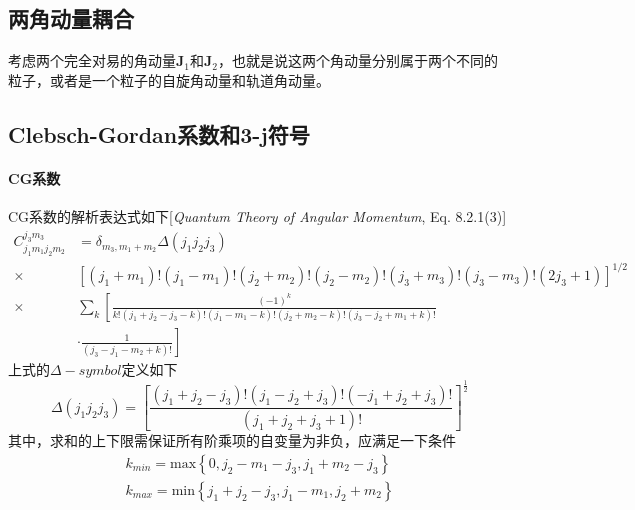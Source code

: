 \subsection{两角动量耦合}
考虑两个完全对易的角动量$\boldsymbol{J}_1$和$\boldsymbol{J}_2$，也就是说这两个角动量分别属于两个不同的粒子，或者是一个粒子的自旋角动量和轨道角动量。


\subsection{Clebsch-Gordan系数和3-j符号}
\paragraph*{CG系数} CG系数的解析表达式如下[\textit{Quantum Theory of Angular Momentum}, Eq. 8.2.1(3)]
\begin{equation}
    \begin{aligned}
        C_{j_1 m_1 j_2 m_2}^{j_3 m_3} 
        &= \delta_{m_3, m_1 + m_2} \Delta(j_1 j_2 j_3) \\
        \times& \left[ (j_1 + m_1)! (j_1 - m_1)! (j_2 + m_2)! (j_2 - m_2)! 
                 (j_3 + m_3)! (j_3 - m_3)!(2j_3 + 1)\right]^{1/2} \\
            \times& \sum_{k}\left[\frac{(-1)^k}{k!(j_1 + j_2 - j_3 - k)!(j_1 - m_1 - k)!
            (j_2 + m_2 - k)!(j_3 - j_2 + m_1 +k)!}\right.\\
                  &\left. \cdot \frac{1}{(j_3 - j_1 - m_2 + k)!} \right]
    \end{aligned}
    \label{eq:CG-representations}
\end{equation}
上式的$\Delta-symbol$定义如下
\begin{equation*}
    \Delta(j_1 j_2 j_3) = \left[ \frac{(j_1 + j_2 - j_3)! (j_1 - j_2 + j_3)! (-j_1 + j_2 + j_3)!}
                                      {(j_1 + j_2 + j_3 +1)!} \right]^{\frac{1}{2}}
\end{equation*}
其中，求和的上下限需保证所有阶乘项的自变量为非负，应满足一下条件
\begin{equation}
    \begin{aligned}
        k_{min} = \text{max} \left\{ 0, j_2 - m_1 - j_3, j_1 + m_2 - j_3 \right\}\\
        k_{max} = \text{min} \left\{ j_1 + j_2 - j_3, j_1 - m_1, j_2 + m_2 \right\}
    \end{aligned}
    \label{eq:CG-nonnegative}
\end{equation}



